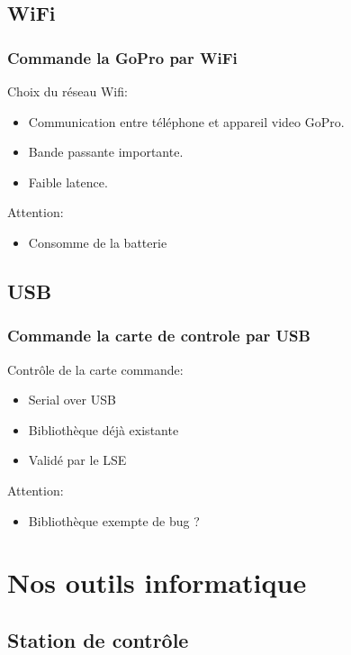 \documentclass[transparent]{beamer}
\begin{document}
\subsection{WiFi}

\begin{frame}
\frametitle{Commande la GoPro par WiFi}
	\begin{block}{Choix du réseau Wifi:}
			\begin{itemize}
				\item Communication entre téléphone et appareil video GoPro.
				\item Bande passante importante.
				\item Faible latence.
			\end{itemize}
	\end{block}
	\begin{block}{Attention:}
			\begin{itemize}
				\item Consomme de la batterie
			\end{itemize}
	\end{block}
\end{frame}

\subsection{USB}

\begin{frame}
\frametitle{Commande la carte de controle par USB}
	\begin{block}{Contrôle de la carte commande:}
			\begin{itemize}
				\item Serial over USB
				\item Bibliothèque déjà existante
				\item Validé par le LSE
			\end{itemize}
	\end{block}
	\begin{block}{Attention:}
			\begin{itemize}
				\item Bibliothèque exempte de bug ?
			\end{itemize}
	\end{block}
\end{frame}
\section{Nos outils informatique}
\subsection{Station de contrôle}
\end{document}
